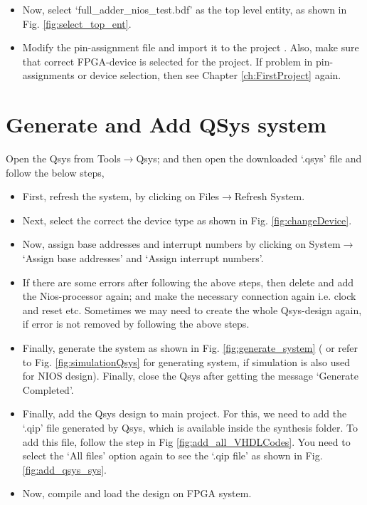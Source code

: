 \begin{itemize}
	\item Now, select `full\_adder\_nios\_test.bdf' as the top level entity, as shown in Fig. \ref{fig:select_top_ent}.
	
	\item Modify the pin-assignment file and import it to the project . Also, make sure that correct FPGA-device is selected for the project. If problem in pin-assignments or device selection, then see Chapter \ref{ch:FirstProject} again. 
\end{itemize}


\section{Generate and Add QSys system}

Open the Qsys from Tools$\rightarrow$Qsys; and then open the downloaded `.qsys' file and follow the below steps, 

\begin{itemize}
	\item First, refresh the system, by clicking on Files$\rightarrow$Refresh System.
	
	\item Next, select the correct the device type as shown in Fig. \ref{fig:changeDevice}. 
	
	\item Now, assign base addresses and interrupt numbers by clicking on System$\rightarrow$`Assign base addresses' and `Assign interrupt numbers'.
	
	\item If there are some errors after following the above steps, then delete and add the Nios-processor again; and make the necessary connection again i.e. clock and reset etc. Sometimes we may need to create the whole Qsys-design again, if error is not removed by following the above steps. 
	
	\item Finally, generate the system as shown in Fig. \ref{fig:generate_system} ( or refer to  Fig. \ref{fig:simulationQsys} for generating system, if simulation is also used for NIOS design). Finally, close the Qsys after getting the message `Generate Completed'. 
	
	\item Finally, add the Qsys design to main project. For this, we need to add the `.qip' file generated by Qsys, which is available inside the synthesis folder. To add this file, follow the step in Fig \ref{fig:add_all_VHDLCodes}. You need to select the 	`All files' option again to see the `.qip file' as shown in Fig. \ref{fig:add_qsys_sys}. 
	
	
	\item Now, compile and load the design on FPGA system. 
\end{itemize}


